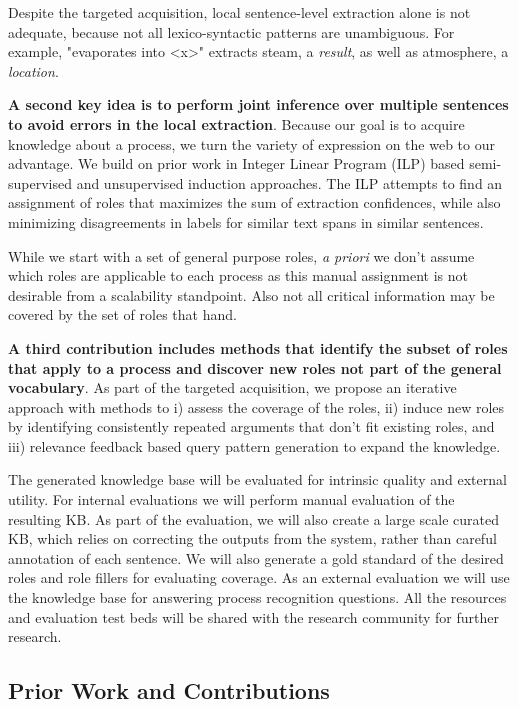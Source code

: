 Despite the targeted acquisition, local sentence-level extraction alone is not adequate, because not all lexico-syntactic patterns are unambiguous. 
For example, "evaporates into <x>" extracts steam, a {\em result}, as well as atmosphere, a {\em location}. 

{\bf A second key idea is to perform joint inference over multiple sentences to avoid errors in the local extraction}.
Because our goal is to acquire knowledge about a process, we turn the variety of expression on the web to our advantage. 
We build on prior work in Integer Linear Program (ILP) based semi-supervised and unsupervised induction approaches. 
The ILP attempts to find an assignment of roles that maximizes the sum of extraction confidences, 
while also minimizing disagreements in labels for similar text spans in similar sentences.

While we start with a set of general purpose roles, {\em a priori} we don't assume which roles are applicable to each process as this manual assignment is not desirable from a scalability standpoint.
Also not all critical information may be covered by the set of roles that hand.

{\bf A third contribution includes methods that identify the subset of roles that apply to a process and discover new roles not part of the general vocabulary}. 
As part of the targeted acquisition, we propose an iterative approach with methods to i) assess the coverage of the roles, ii) induce new roles by identifying consistently repeated arguments that don't fit existing roles, and iii) relevance feedback based query pattern generation to expand the knowledge.

The generated knowledge base will be evaluated for intrinsic quality and external utility. For internal evaluations we will perform manual evaluation of the resulting KB. As part of the evaluation, we will also create a large scale curated KB, which relies on correcting the outputs from the system, rather than careful annotation of each sentence. We will also generate a gold standard of the desired roles and role fillers for evaluating coverage. As an external evaluation we will use the knowledge base for answering process recognition questions. All the resources and evaluation test beds will be shared with the research community for further research.

\subsection{Prior Work and Contributions}

